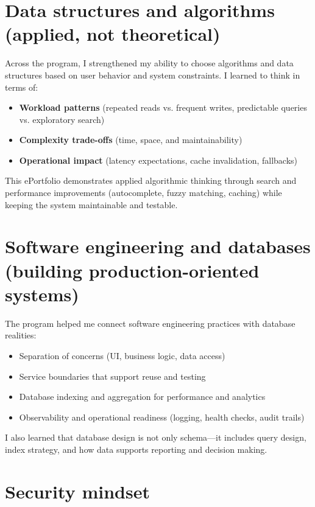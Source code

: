 \documentclass[12pt,stu]{apa7}
\begin{document}
\section*{Data structures and algorithms (applied, not theoretical)}

Across the program, I strengthened my ability to choose algorithms and data structures based on user behavior and system constraints. I learned to think in terms of:

\begin{itemize}
  \item \textbf{Workload patterns} (repeated reads vs. frequent writes, predictable queries vs. exploratory search)
  \item \textbf{Complexity trade-offs} (time, space, and maintainability)
  \item \textbf{Operational impact} (latency expectations, cache invalidation, fallbacks)
\end{itemize}

This ePortfolio demonstrates applied algorithmic thinking through search and performance improvements (autocomplete, fuzzy matching, caching) while keeping the system maintainable and testable.

\section*{Software engineering and databases (building production-oriented systems)}

The program helped me connect software engineering practices with database realities:

\begin{itemize}
  \item Separation of concerns (UI, business logic, data access)
  \item Service boundaries that support reuse and testing
  \item Database indexing and aggregation for performance and analytics
  \item Observability and operational readiness (logging, health checks, audit trails)
\end{itemize}

I also learned that database design is not only schema---it includes query design, index strategy, and how data supports reporting and decision making.

\section*{Security mindset}
\end{document}
